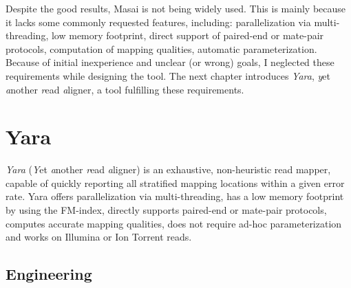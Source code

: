 Despite the good results, Masai is not being widely used.
This is mainly because it lacks some commonly requested features, including:
parallelization via multi-threading, low memory footprint, direct support of paired-end or mate-pair protocols, computation of mapping qualities, automatic parameterization.
Because of initial inexperience and unclear (or wrong) goals, I neglected these requirements while designing the tool.
The next chapter introduces \emph{Yara}, \emph{y}et \emph{a}nother \emph{r}ead \emph{a}ligner, a tool fulfilling these requirements.



\chapter{Yara}



\emph{Yara} (\emph{Y}et \emph{a}nother \emph{r}ead \emph{a}ligner) is an exhaustive, non-heuristic read mapper, capable of quickly reporting all stratified mapping locations within a given error rate.
Yara offers parallelization via multi-threading, has a low memory footprint by using the FM-index, directly supports paired-end or mate-pair protocols, computes accurate mapping qualities, does not require ad-hoc parameterization and works on Illumina or Ion Torrent reads.


\section{Engineering}


